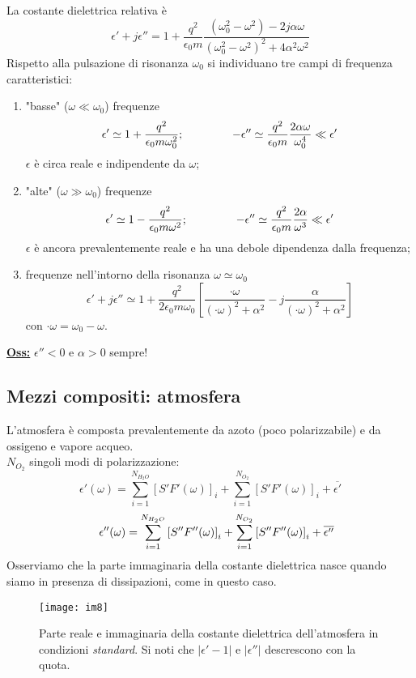 \documentclass[a4paper]{article}
\begin{document}
La costante dielettrica relativa è
\begin{equation*}
\epsilon'+j\epsilon''=1+\frac{q^2}{\epsilon_0m}\frac{(\omega_0^2-\omega^2)-2j\alpha\omega}{(\omega_0^2-\omega^2)^2+4\alpha^2\omega^2}
\end{equation*}
Rispetto alla pulsazione di risonanza $\omega_0$ si individuano tre campi di frequenza caratteristici:
\begin{enumerate}
\item "basse" ($\omega\ll\omega_0$) frequenze
\begin{equation*}
\epsilon'\simeq1+\frac{q^2}{\epsilon_0m\omega_0^2};\hspace{15mm}-\epsilon''\simeq\frac{q^2}{\epsilon_0m}\frac{2\alpha\omega}{\omega_0^4}\ll\epsilon'
\end{equation*}
$\epsilon$ è circa reale e indipendente da $\omega$;
\item "alte" ($\omega\gg\omega_0$) frequenze
\begin{equation*}
\epsilon'\simeq1-\frac{q^2}{\epsilon_0m\omega^2};\hspace{15mm}-\epsilon''\simeq\frac{q^2}{\epsilon_0m}\frac{2\alpha}{\omega^3}\ll\epsilon'
\end{equation*}
$\epsilon$ è ancora prevalentemente reale e ha una debole dipendenza dalla frequenza;
\item frequenze nell'intorno della risonanza $\omega\simeq\omega_0$
\begin{equation*}
\epsilon'+j\epsilon''\simeq1+\frac{q^2}{2\epsilon_0m\omega_0}\left[\frac{·\omega}{(·\omega)^2+\alpha^2}-j\frac{\alpha}{(·\omega)^2+\alpha^2}\right]
\end{equation*}
con $·\omega=\omega_0-\omega$.\\
\end{enumerate}
\underline{\textbf{Oss:}} $\epsilon''<0$ e $\alpha>0$ sempre!
\subsection*{Mezzi compositi: atmosfera}
L'atmosfera è composta prevalentemente da azoto (poco polarizzabile) e da ossigeno e vapore acqueo.\\
$N_{O_2}$ singoli modi di polarizzazione:
\begin{equation*}
\epsilon'(\omega)=\sum_{i=1}^{N_{H_2O}}\left[S'F'(\omega)\right]_i+\sum_{i=1}^{N_{O_2}}\left[S'F'(\omega)\right]_i+\overline{\epsilon'}
\end{equation*}
\begin{equation*}
\hspace*{4mm}\epsilon''(\omega)=\sum_{i=1}^{N_{H_2O}}\left[S''F''(\omega)\right]_i+\sum_{i=1}^{N_{O_2}}\left[S''F''(\omega)\right]_i+\overline{\epsilon''}
\end{equation*}
Osserviamo che la parte immaginaria della costante dielettrica nasce quando siamo in presenza di dissipazioni, come in questo caso.
\begin{figure}[ht] 
\centering
\texttt{[image: im8]}
\caption{Parte reale e immaginaria della costante dielettrica dell'atmosfera in condizioni \emph{standard}. Si noti che $|\epsilon'-1|$ e $|\epsilon''|$ descrescono con la quota.}
\end{figure}
\end{document}
